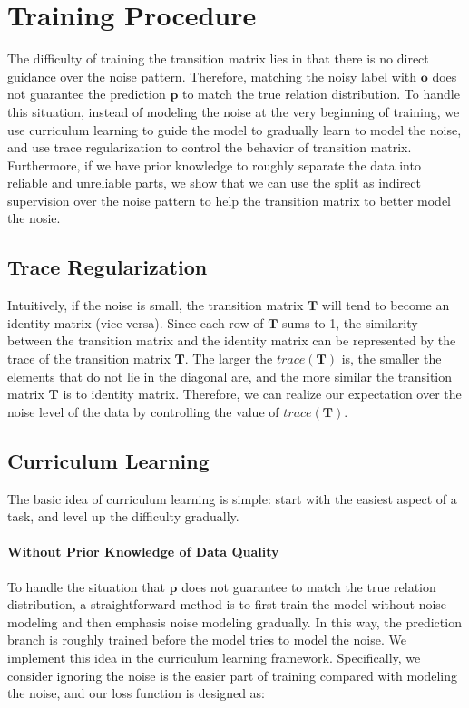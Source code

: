 \section{Training Procedure \label{sec:training}}
The difficulty of training the transition matrix lies in that there is no direct guidance over the noise pattern. Therefore, matching the noisy label with $\mathbf{o}$ does not guarantee the prediction $\mathbf{p}$ to match the true relation distribution. To handle this situation, instead of modeling the noise at the very beginning of training, we use curriculum learning to guide the model to gradually learn to model the noise, and use trace regularization to control the behavior of transition matrix. Furthermore, if we have prior knowledge to roughly separate the data into reliable and unreliable parts, we show that we can use the split as indirect supervision over the noise pattern to help the transition matrix to better model the nosie.

\subsection{Trace Regularization}
Intuitively, if the noise is small, the transition matrix $\mathbf{T}$ will tend to become an identity matrix (vice versa).  Since each row of $\mathbf{T}$ sums to 1, the similarity between the transition matrix and the identity matrix can be represented by the trace of the transition matrix $\mathbf{T}$. The larger the $trace(\mathbf{T})$ is, the smaller the elements that do not lie in the diagonal are, and the more similar the transition matrix $\mathbf{T}$ is to identity matrix. Therefore, we can realize our expectation over the noise level of the data by controlling the value of $trace(\mathbf{T})$.

\subsection{Curriculum Learning}
The basic idea of curriculum learning is simple: start with the easiest aspect of a task, and level up the difficulty gradually.

\paragraph{Without Prior Knowledge of Data Quality}
To handle the situation that $\mathbf{p}$ does not guarantee to match the true relation distribution, a straightforward method is to first train the model without noise modeling and then emphasis noise modeling gradually. In this way, the prediction branch is roughly trained before the model tries to model the noise. We implement this idea in the curriculum learning framework. Specifically, we consider ignoring the noise is the easier part of training compared with modeling the noise, and our loss function is designed as:


